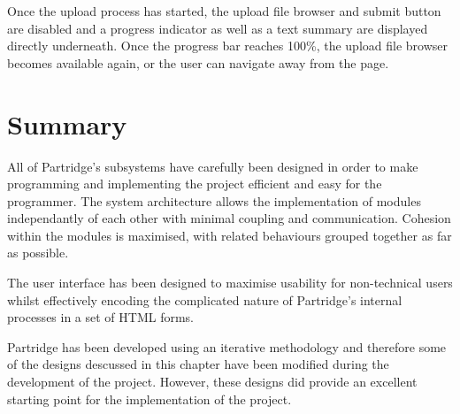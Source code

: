 Once the upload process has started, the upload file browser and submit button
are disabled and a progress indicator as well as a text summary are displayed
directly underneath. Once the progress bar reaches 100\%, the upload file
browser becomes available again, or the user can navigate away from the page.

\section{ Summary}

All of Partridge's subsystems have carefully been designed in order to make
programming and implementing the project efficient and easy for the programmer.
The system architecture allows the implementation of modules independantly of
each other with minimal coupling and communication. Cohesion within the modules
is maximised, with related behaviours grouped together as far as possible.

The user interface has been designed to maximise usability for non-technical
users whilst effectively encoding the complicated nature of Partridge's
internal processes in a set of HTML forms.

Partridge has been developed using an iterative methodology and therefore some
of the designs descussed in this chapter have been modified during the
development of the project. However, these designs did provide an excellent
starting point for the implementation of the project.

